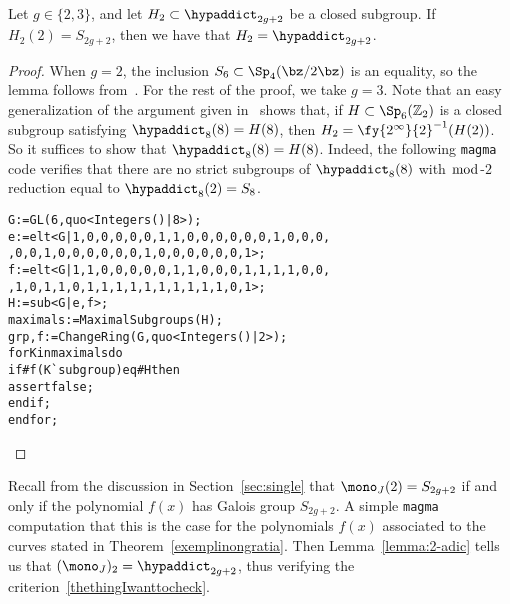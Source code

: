 \begin{lemma} \label{lemma:2-adic}
	Let $g \in \{2,3\}$, and let $H_2 \subset \hypaddict_{2g+2}$ be a closed subgroup. If $H_2(2) = S_{2g+2}$, then we have that $H_2 = \hypaddict_{2g+2}$. 
\end{lemma} 
\begin{proof} 
	When $g = 2$, the inclusion $S_6 \subset \Sp_4(\bz / 2 \bz)$ is an equality, so the lemma follows from~\cite[Theorem 1]{landesman-swaminathan-tao-xu:lifting-symplectic-group}. For the rest of the proof, we take $g = 3$. Note that an easy generalization of the argument given in~\cite[Lemma 3, Section IV.3.4]{serre1989abelian} shows that, if $H \subset \Sp_{6}(\mathbb Z_2)$ is a closed subgroup satisfying $\hypaddict_{8}(8) = H(8)$, then $H_2 = \fy{2^{\infty}}{2}^{-1}(H(2))$.
So it suffices to show that
$\hypaddict_{8}(8) = H(8)$.
	Indeed, the following \texttt{magma} code verifies that there are no strict subgroups of
$\hypaddict_{8}(8)$ with $\bmod$-$2$ reduction equal to
$\hypaddict_{8}(2) = S_{8}$.
\vspace*{0.1in}
\begin{adjustwidth}{0.5in}{0in}
\begin{alltt}
G := GL(6,quo<Integers()|8>);
e := elt<G| 1,0,0,0,0,0,1,1,0,0,0,0,0,0,1,0,0,0,
,0,0,1,0,0,0,0,0,0,1,0,0,0,0,0,0,1>;
f := elt<G|1,1,0,0,0,0,0,1,1,0,0,0,1,1,1,1,0,0, 
,1,0,1,1,0,1,1,1,1,1,1,1,1,1,1,0,1>;
H := sub<G|e,f>;
maximals := MaximalSubgroups(H);
grp, f := ChangeRing(G, quo<Integers()|2>);
for K in maximals do
    if #f(K{\`{}}subgroup) eq #H then
        assert false;
    end if;
end for; \qedhere
\end{alltt}
\end{adjustwidth}
\end{proof}

Recall from the discussion in Section~\ref{sec:single} that $\mono_J(2) = S_{2g+2}$ if and only if the polynomial $f(x)$ has Galois group $S_{2g+2}$. A simple {\tt magma} computation that this is the case for the polynomials $f(x)$ associated to the curves stated in Theorem~\ref{exemplinongratia}.
Then Lemma~\ref{lemma:2-adic} tells us that $(\mono_J)_2 = \hypaddict_{2g+2}$, thus verifying the criterion~\eqref{thethingIwanttocheck}. 

